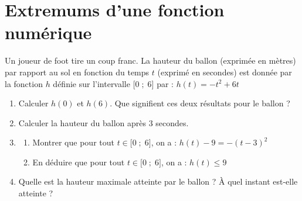 \documentclass[10pt, a4paper]{article}
\begin{document}
\section{Extremums d'une fonction numérique }

\begin{Activite}[][15 min]
Un joueur de foot tire un coup franc. La hauteur du ballon (exprimée en mètres) par rapport au sol en fonction du temps $t$ (exprimé en secondes) est donnée par la fonction $h$ définie sur l'intervalle $\big[0 \;;\; 6\big]$ par : \quad $h(t) = -t^2 + 6t$

\begin{enumerate}[leftmargin=*,itemsep=0.5pt]
    \item Calculer $h(0)$ et $h(6)$. Que signifient ces deux résultats pour le ballon ?
    \item Calculer la hauteur du ballon après $3$ secondes.
    \item
    \begin{enumerate}[leftmargin=*,itemsep=0.5pt]
    \item Montrer que pour tout $t \in \big[0 \;;\; 6\big]$, on a : $h(t) - 9 = -(t - 3)^2$
    \item En déduire que pour tout $t \in \big[0 \;;\; 6\big]$, on a : $h(t) \leq 9$
    \end{enumerate}
    \item Quelle est la hauteur maximale atteinte par le ballon ? À quel instant est-elle atteinte ?
\end{enumerate}
\end{Activite}
\end{document}
